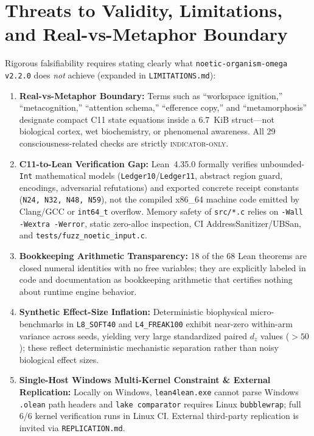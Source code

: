 \documentclass[11pt,reqno]{amsart}
\theoremstyle{remark}
\newcommand{\tagIO}{\textsc{indicator-only}}
\begin{document}
\section{Threats to Validity, Limitations, and Real-vs-Metaphor Boundary}
\label{sec:limitations}

Rigorous falsifiability requires stating clearly what \texttt{noetic-organism-omega v2.2.0} does \emph{not} achieve (expanded in \texttt{LIMITATIONS.md}):
\begin{enumerate}[leftmargin=1.8em, itemsep=2pt]
  \item \textbf{Real-vs-Metaphor Boundary:} Terms such as ``workspace ignition,'' ``metacognition,'' ``attention schema,'' ``efference copy,'' and ``metamorphosis'' designate compact C11 state equations inside a 6.7~KiB struct—not biological cortex, wet biochemistry, or phenomenal awareness. All 29 consciousness-related checks are strictly \tagIO{}.
  \item \textbf{C11-to-Lean Verification Gap:} Lean~4.35.0 formally verifies unbounded-\texttt{Int} mathematical models (\texttt{Ledger10}/\texttt{Ledger11}, abstract region guard, encodings, adversarial refutations) and exported concrete receipt constants (\texttt{N24, N32, N48, N59}), not the compiled x86\_64 machine code emitted by Clang/GCC or \texttt{int64\_t} overflow. Memory safety of \texttt{src/*.c} relies on \texttt{-Wall -Wextra -Werror}, static zero-alloc inspection, CI AddressSanitizer/UBSan, and \texttt{tests/fuzz\_noetic\_input.c}.
  \item \textbf{Bookkeeping Arithmetic Transparency:} 18 of the 68 Lean theorems are closed numeral identities with no free variables; they are explicitly labeled in code and documentation as bookkeeping arithmetic that certifies nothing about runtime engine behavior.
  \item \textbf{Synthetic Effect-Size Inflation:} Deterministic biophysical micro-benchmarks in \texttt{L8\_SOFT40} and \texttt{L4\_FREAK100} exhibit near-zero within-arm variance across seeds, yielding very large standardized paired $d_z$ values ($> 50$); these reflect deterministic mechanistic separation rather than noisy biological effect sizes.
  \item \textbf{Single-Host Windows Multi-Kernel Constraint \& External Replication:} Locally on Windows, \texttt{lean4lean.exe} cannot parse Windows \texttt{.olean} path headers and \texttt{lake comparator} requires Linux \texttt{bubblewrap}; full 6/6 kernel verification runs in Linux CI. External third-party replication is invited via \texttt{REPLICATION.md}.
\end{enumerate}
\end{document}
